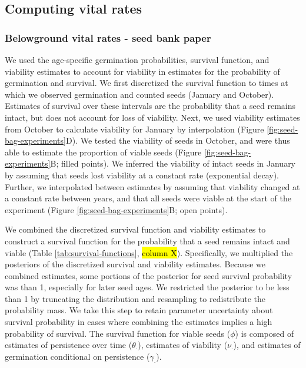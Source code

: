 \documentclass[12pt, oneside, titlepage]{article}   	%
\begin{document}
\subsection{Computing vital rates}

\subsubsection{Belowground vital rates - seed bank paper}

We used the age-specific germination probabilities, survival function, and viability estimates to account for viability in estimates for the probability of germination and survival. We first discretized the survival function to times at which we observed germination and counted seeds (January and October). Estimates of survival over these intervals are the probability that a seed remains intact, but does not account for loss of viability. Next, we used viability estimates from October to calculate viability for January by interpolation (Figure \ref{fig:seed-bag-experiments}D). We tested the viability of seeds in October, and were thus able to estimate the proportion of viable seeds (Figure \ref{fig:seed-bag-experiments}B; filled points). We inferred the viability of intact seeds in January by assuming that seeds lost viability at a constant rate (exponential decay). Further, we interpolated between estimates by assuming that viability changed at a constant rate between years, and that all seeds were viable at the start of the experiment (Figure \ref{fig:seed-bag-experiments}B; open points). 

We combined the discretized survival function and viability estimates to construct a survival function for the probability that a seed remains intact and viable (Table \ref{tab:survival-functions}, \hl{column X}). Specifically, we multiplied the posteriors of the discretized survival and viability estimates. Because we combined estimates, some portions of the posterior for seed survival probability was than 1, especially for later seed ages. We restricted the posterior to be less than 1 by truncating the distribution and resampling to redistribute the probability mass. We take this step to retain parameter uncertainty about survival probability in cases where combining the estimates implies a high probability of survival. The survival function for viable seeds ($\phi$) is composed of estimates of persistence over time ($\theta_\cdot$), estimates of viability ($\nu_\cdot$), and estimates of germination conditional on persistence ($\gamma_\cdot$).
\end{document}
